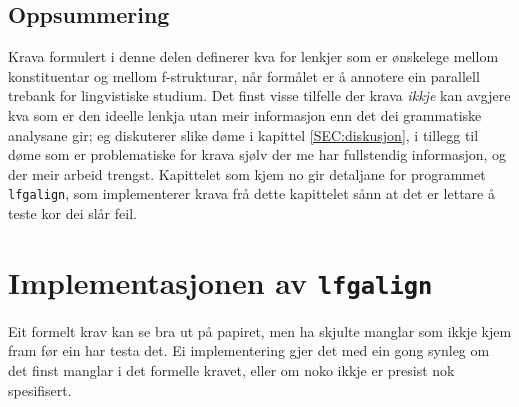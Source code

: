 \documentclass[11pt,a4paper,oneside,draft]{report}
\begin{document}
\section{Oppsummering}
\label{sec-3.9}

Krava formulert i denne delen definerer kva for lenkjer som er
ønskelege mellom konstituentar og mellom f-strukturar, når formålet er
å annotere ein parallell trebank for lingvistiske studium. Det finst
visse tilfelle der krava \emph{ikkje} kan avgjere kva som er den ideelle
lenkja utan meir informasjon enn det dei grammatiske analysane gir; eg
diskuterer slike døme i kapittel \ref{SEC:diskusjon}, i tillegg til
døme som er problematiske for krava sjølv der me har fullstendig
informasjon, og der meir arbeid trengst. Kapittelet som kjem no gir
detaljane for programmet \texttt{lfgalign}, som implementerer krava frå dette
kapittelet sånn at det er lettare å teste kor dei slår feil.


\chapter{Implementasjonen av \texttt{lfgalign}}
\label{sec-4}

\label{SEC:implementasjon}


Eit formelt krav kan se bra ut på papiret, men ha skjulte manglar som
ikkje kjem fram før ein har testa det.  Ei implementering gjer det med
ein gong synleg om det finst manglar i det formelle kravet, eller om
noko ikkje er presist nok spesifisert.
\end{document}
